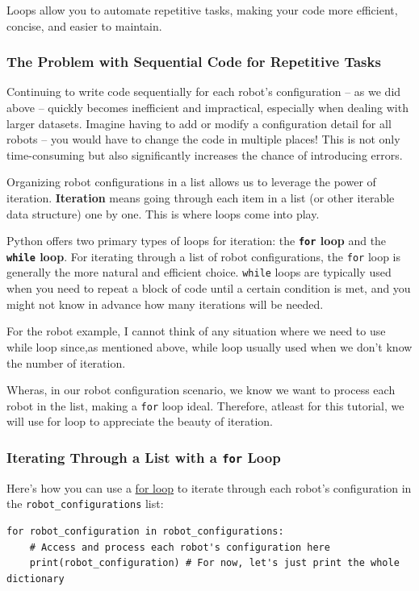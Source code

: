 Loops allow you to automate repetitive tasks, making your code more efficient, concise, and easier to maintain.




\subsubsection{The Problem with Sequential Code for Repetitive Tasks}



Continuing to write code sequentially for each robot's configuration – as we did above – quickly becomes inefficient and impractical, especially when dealing with larger datasets. Imagine having to add or modify a configuration detail for all robots – you would have to change the code in multiple places! This is not only time-consuming but also significantly increases the chance of introducing errors.

Organizing robot configurations in a list allows us to leverage the power of iteration. \textbf{Iteration} means going through each item in a list (or other iterable data structure) one by one. This is where loops come into play.

Python offers two primary types of loops for iteration: the \textbf{\texttt{for} loop} and the \textbf{\texttt{while} loop}. For iterating through a list of robot configurations, the \texttt{for} loop is generally the more natural and efficient choice. \texttt{while} loops are typically used when you need to repeat a block of code until a certain condition is met, and you might not know in advance how many iterations will be needed. 

For the robot example, I cannot think of any situation where we need to use while loop since,as mentioned above, while loop usually used when we don't know the number of iteration. 

Wheras, in our robot configuration scenario, we know we want to process each robot in the list, making a \texttt{for} loop ideal. Therefore, atleast for this tutorial, we will use for loop to appreciate the beauty of iteration.

\subsubsection{Iterating Through a List with a \texttt{for} Loop}
\label{sec:iteratinglist}
Here's how you can use a \href{https://github.com/balandongiv/computer_programming_gist/blob/main/session3/for_loop.py}{for loop} to iterate through each robot's configuration in the \texttt{robot\_configurations} list:
\begin{verbatim}
for robot_configuration in robot_configurations:
    # Access and process each robot's configuration here
    print(robot_configuration) # For now, let's just print the whole dictionary
\end{verbatim}


